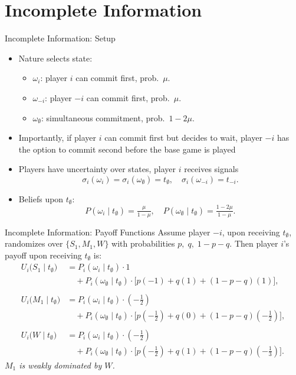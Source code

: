 \documentclass[Output/slides.tex]{subfiles}
\begin{document}
\section{Incomplete Information}
\begin{frame}{Incomplete Information: Setup}
\begin{itemize}
  \item Nature selects state:
    \begin{itemize}
      \item \(\omega_i\): player \(i\) can commit first, prob.\ \(\mu\).
      \item \(\omega_{-i}\): player \(-i\) can commit first, prob.\ \(\mu\).
      \item \(\omega_\emptyset\): simultaneous commitment, prob.\ \(1-2\mu\).
    \end{itemize}
  \item Importantly, if player $i$ can commit first but decides to wait, player $-i$ has the option to commit second before the base game is played \pause
  \item Players have uncertainty over states, player \(i\) receives signals
    \[
      \sigma_i(\omega_i)=\sigma_i(\omega_\emptyset)=t_\emptyset,\quad
      \sigma_i(\omega_{-i})=t_{-i}.
    \]
  \item Beliefs upon \(t_\emptyset\):
    \[
      P(\omega_i \mid t_\emptyset)=\tfrac{\mu}{1-\mu},\quad
      P(\omega_\emptyset \mid t_\emptyset)=\tfrac{1-2\mu}{1-\mu}.
    \]
\end{itemize}
\end{frame}
\begin{frame}{Incomplete Information: Payoff Functions}
Assume player \(-i\), upon receiving \(t_\emptyset\), randomizes over 
\(\{S_1, M_1, W\}\) with probabilities \(p,\;q,\;1-p-q\).  
Then player \(i\)’s payoff upon receiving \(t_\emptyset\) is:
\pause
\vspace{0.3ex}
\footnotesize
\begin{align*}
U_i\bigl(S_1 \mid t_\emptyset\bigr)
&= P_i(\omega_i\mid t_\emptyset)\cdot 1 \\
&\quad + P_i(\omega_\emptyset\mid t_\emptyset) \cdot \bigl[ p(-1) + q(1) + (1 - p - q)(1) \bigr], \\
\\
U_i\bigl(M_1 \mid t_\emptyset\bigr)
&= P_i(\omega_i\mid t_\emptyset)\cdot (-\tfrac{1}{2}) \\
&\quad + P_i(\omega_\emptyset\mid t_\emptyset) \cdot \bigl[ p(-\tfrac{1}{2}) + q(0) + (1 - p - q)(-\tfrac{1}{2}) \bigr], \\
\\
U_i\bigl(W \mid t_\emptyset\bigr)
&= P_i(\omega_i\mid t_\emptyset)\cdot (-\tfrac{1}{2}) \\
&\quad + P_i(\omega_\emptyset\mid t_\emptyset) \cdot \bigl[ p(-\tfrac{1}{2}) + q(1) + (1 - p - q)(-\tfrac{1}{3}) \bigr].
\end{align*}
\normalsize
\vspace{0.5ex}
\emph{\(M_1\) is weakly dominated by \(W\).}
\end{frame}
\end{document}
